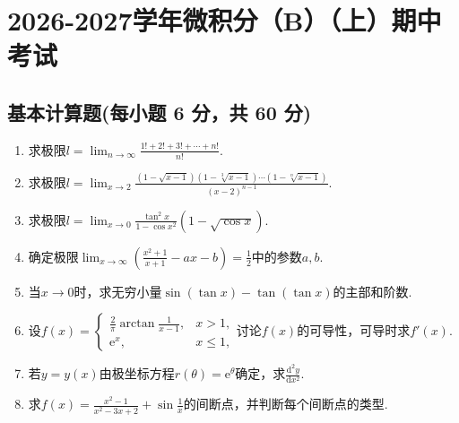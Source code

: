 \documentclass[../main.tex]{subfiles}
\begin{document}
\chapter{2026-2027学年微积分（B）（上）期中考试}

\section{基本计算题(每小题 6 分，共 60 分)}
\begin{enumerate}
    \item 求极限$l=\lim_{n\to\infty}\frac{1!+2!+3!+\cdots+n!}{n!}$.
          \vspace{8em}

    \item 求极限$l=\lim_{x\to2}\frac{(1-\sqrt{x-1})(1-\sqrt[3]{x-1})\cdots(1-\sqrt[n]{x-1})}{(x-2)^{n-1}}$.
          \vspace{8em}

    \item 求极限$l=\lim_{x\to0}\frac{\tan^{2}x}{1-\cos x^{2}}\left(1-\sqrt{\cos x}\right)$.
          \vspace{7em}

    \item 确定极限$\lim_{x\to\infty}\left(\frac{x^{2}+1}{x+1}-ax-b\right)=\frac{1}{2}$中的参数$a,b$.
          \vspace{7em}

    \item 当$x\to0$时，求无穷小量$\sin(\tan x)-\tan(\tan x)$的主部和阶数.
          \vspace{9em}

    \item 设$f(x)=
              \begin{cases}
                  \frac{2}{\pi}\arctan\frac{1}{x-1}, & x>1,    \\
                  \mathrm{e}^{x},                    & x\leq1,
              \end{cases}$讨论$f(x)$的可导性，可导时求$f'(x)$.
          \vspace{9em}

    \item 若$y=y(x)$由极坐标方程$r(\theta)=\mathrm{e}^{\theta}$确定，求$\frac{\mathrm{d}^{2}y}{\mathrm{d}
                  x^{2}}$.
          \vspace{9em}

    \item 求$f(x)=\frac{x^{2}-1}{x^{2}-3x+2}+\sin\frac{1}{x}$的间断点，并判断每个间断点的类型.
          \vspace{9em}


\end{enumerate}
\end{document}
